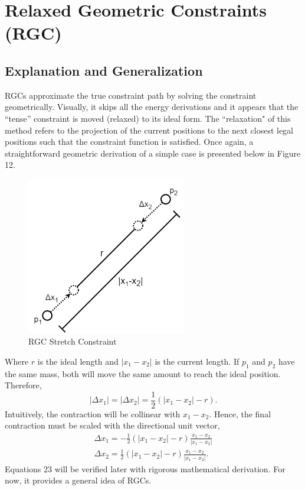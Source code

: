 \documentclass[12pt, letterpaper]{article}
\begin{document}
\section{Relaxed Geometric Constraints (RGC)}
\subsection{Explanation and Generalization}
\hspace{\parindent} RGCs approximate the true constraint path by solving the constraint geometrically. Visually, it skips all the energy derivations and it appears that the ``tense” constraint is moved (relaxed) to its ideal form. The ``relaxation" of this method refers to the projection of the current positions to the next closest legal positions such that the constraint function is satisfied. Once again, a straightforward geometric derivation of a simple case is presented below in Figure 12. 
\begin{figure}[H]
\centering
\includegraphics[width=7cm]{rgc diagram.png}
\caption{RGC Stretch Constraint}
\label{fig:figure}
\end{figure} 
\noindent Where $r$ is the ideal length and $|x_{1}-x_{2}|$ is the current length.
If $p_1$ and $p_2$ have the same mass, both will move the same amount to reach the ideal position. 
Therefore, $$|\Delta x_{1}| = |\Delta x_{2}| = \frac{1}{2} (|x_{1}-x_{2}| - r).$$
Intuitively, the contraction will be collinear with $x_1-x_2$. Hence, the final contraction must be scaled with the directional unit vector,
\begin{equation}
    \begin{gathered}
        \Delta x_{1} = -\frac{1}{2} (|x_{1}-x_{2}| - r) \frac{x_{1} - x_{2}}{|x_{1} - x_{2}|}\\
        \Delta x_{2} = \frac{1}{2} (|x_{1}-x_{2}| - r) \frac{x_{1} - x_{2}}{|x_{1} - x_{2}|}.
    \end{gathered}
\end{equation}
Equations 23 will be verified later with rigorous mathematical derivation. For now, it provides a general idea of RGCs. 
\end{document}
